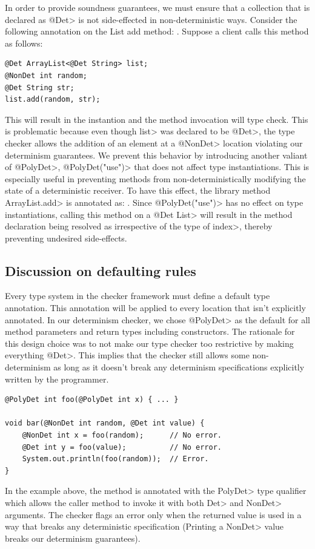 In order to provide soundness guarantees, we must ensure that a collection that is
declared as \<@Det> is not side-effected in non-deterministic ways. Consider the following annotation 
on the List add method: .
Suppose a client calls this method as follows:
\begin{verbatim}
@Det ArrayList<@Det String> list;
@NonDet int random;
@Det String str;
list.add(random, str);
\end{verbatim}
This will result in the instantion  and
the method invocation will type check. This is problematic because even though \<list> was declared to be \<@Det>,
the type checker allows the addition of an element at a \<@NonDet> location violating our determinism guarantees.
We prevent this behavior by introducing another valiant of \<@PolyDet>, \<@PolyDet("use")> that does not affect
type instantiations. This is especially useful in preventing methods from non-deterministically modifying the state
of a deterministic receiver. To have this effect, the library method \<ArrayList.add> is annotated as:
.
Since \<@PolyDet("use")> has no effect on type instantiations, calling this method on a \<@Det List>
will result in the method declaration being resolved as 
irrespective of the type of \<index>, thereby preventing undesired side-effects.

\subsection{Discussion on defaulting rules}\label{defaulting}
Every type system in the checker framework must define a default type annotation. This annotation will be applied
to every location that isn't explicitly annotated. In our determinism checker, we chose \<@PolyDet> as the default for all 
method parameters and return types including constructors.
The rationale for this design choice was to not make our type checker too restrictive by making everything \<@Det>.  This implies that
the checker still allows some non-determinism as long as it doesn't break any determinism specifications explicitly written by the programmer.

\begin{verbatim}
@PolyDet int foo(@PolyDet int x) { ... }

void bar(@NonDet int random, @Det int value) {
    @NonDet int x = foo(random);      // No error.
    @Det int y = foo(value);          // No error.
    System.out.println(foo(random));  // Error.
}
\end{verbatim}
In the example above, the method  is annotated with the \<PolyDet> type qualifier which allows
the caller method  to invoke it with both \<Det> and \<NonDet> arguments. The checker flags an error 
only when the returned value is used in a way that breaks any deterministic specification (Printing a \<NonDet> value
breaks our determinism guarantees).

